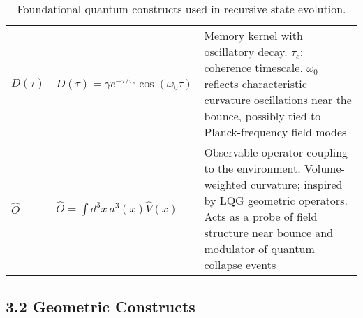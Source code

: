 \begin{table}[h!]
\begin{tabular}{>{\raggedright}p{3cm}>{\raggedright}p{6.5cm}>{\raggedright\arraybackslash}p{5cm}}
\addlinespace
$D(\tau)$ & $D(\tau) = \gamma e^{-\tau / \tau_c} \cos(\omega_0 \tau)$ & Memory kernel with oscillatory decay. $\tau_c$: coherence timescale. $\omega_0$ reflects characteristic curvature oscillations near the bounce, possibly tied to Planck-frequency field modes \cite{grigolini1999coherence} \\
\addlinespace
$\hat{O}$ & $\hat{O} = \int d^3x \, a^3(x) \hat{V}(x)$ & Observable operator coupling to the environment. Volume-weighted curvature; inspired by LQG geometric operators. Acts as a probe of field structure near bounce and modulator of quantum collapse events \cite{ashtekar2004background} \\
\bottomrule
\end{tabular}
\caption{Foundational quantum constructs used in recursive state evolution.}
\end{table}

\subsection*{3.2 Geometric Constructs}

